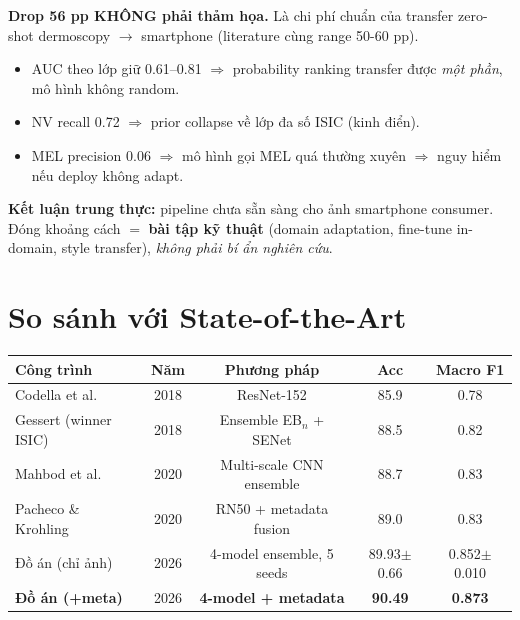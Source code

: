 \documentclass[11pt,a4paper]{article}
\begin{document}
\begin{idea}
\textbf{Drop 56 pp KHÔNG phải thảm họa.} Là chi phí chuẩn của transfer zero-shot dermoscopy $\to$ smartphone (literature cùng range 50-60 pp).
\begin{itemize}[leftmargin=*]
  \item AUC theo lớp giữ 0.61--0.81 $\Rightarrow$ probability ranking transfer được \textit{một phần}, mô hình không random.
  \item NV recall 0.72 $\Rightarrow$ prior collapse về lớp đa số ISIC (kinh điển).
  \item MEL precision 0.06 $\Rightarrow$ mô hình gọi MEL quá thường xuyên $\Rightarrow$ nguy hiểm nếu deploy không adapt.
\end{itemize}
\textbf{Kết luận trung thực:} pipeline chưa sẵn sàng cho ảnh smartphone consumer. Đóng khoảng cách $=$ \textbf{bài tập kỹ thuật} (domain adaptation, fine-tune in-domain, style transfer), \textit{không phải bí ẩn nghiên cứu}.
\end{idea}

\section{So sánh với State-of-the-Art}

\begin{table}[h]
\centering\small
\begin{tabular}{lcccc}
\toprule
\textbf{Công trình} & \textbf{Năm} & \textbf{Phương pháp} & \textbf{Acc} & \textbf{Macro F1} \\
\midrule
Codella et al.        & 2018 & ResNet-152                & 85.9 & 0.78 \\
Gessert (winner ISIC) & 2018 & Ensemble EB$_n$ + SENet   & 88.5 & 0.82 \\
Mahbod et al.         & 2020 & Multi-scale CNN ensemble  & 88.7 & 0.83 \\
Pacheco \& Krohling   & 2020 & RN50 + metadata fusion    & 89.0 & 0.83 \\
Đồ án (chỉ ảnh)       & 2026 & 4-model ensemble, 5 seeds & 89.93$\pm$0.66 & 0.852$\pm$0.010 \\
\rowcolor{usthblue!10}
\textbf{Đồ án (+meta)} & 2026 & \textbf{4-model + metadata} & \textbf{90.49} & \textbf{0.873} \\
\bottomrule
\end{tabular}
\end{table}
\end{document}
